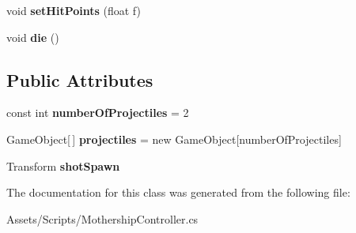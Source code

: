 \begin{DoxyCompactItemize}
\item 
\hypertarget{class_mothership_controller_ac1b81fcf4d41ed37bb78a910c26bdd01}{}void {\bfseries set\+Hit\+Points} (float f)\label{class_mothership_controller_ac1b81fcf4d41ed37bb78a910c26bdd01}

\item 
\hypertarget{class_mothership_controller_afceaa308c6fe75230435ae3919884567}{}void {\bfseries die} ()\label{class_mothership_controller_afceaa308c6fe75230435ae3919884567}

\end{DoxyCompactItemize}
\subsection*{Public Attributes}
\begin{DoxyCompactItemize}
\item 
\hypertarget{class_mothership_controller_ab254645a0513f81cbbefebd1bb968f34}{}const int {\bfseries number\+Of\+Projectiles} = 2\label{class_mothership_controller_ab254645a0513f81cbbefebd1bb968f34}

\item 
\hypertarget{class_mothership_controller_a86a776669f6ea621e1f6ea6fc7fc7bef}{}Game\+Object\mbox{[}$\,$\mbox{]} {\bfseries projectiles} = new Game\+Object\mbox{[}number\+Of\+Projectiles\mbox{]}\label{class_mothership_controller_a86a776669f6ea621e1f6ea6fc7fc7bef}

\item 
\hypertarget{class_mothership_controller_a65784c718e515ead8d18d9e0babae38e}{}Transform {\bfseries shot\+Spawn}\label{class_mothership_controller_a65784c718e515ead8d18d9e0babae38e}

\end{DoxyCompactItemize}


The documentation for this class was generated from the following file\+:\begin{DoxyCompactItemize}
\item 
Assets/\+Scripts/Mothership\+Controller.\+cs\end{DoxyCompactItemize}
